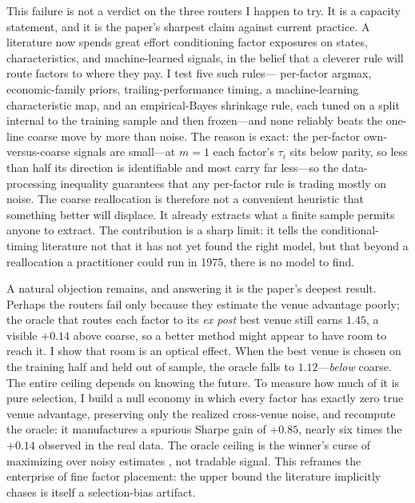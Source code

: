 \documentclass[12pt]{article}
\theoremstyle{plain}
\theoremstyle{definition}
\begin{document}
This failure is not a verdict on the three routers I happen to try. It is a
capacity statement, and it is the paper's sharpest claim against current
practice. A literature now spends great effort conditioning factor exposures on
states, characteristics, and machine-learned signals, in the belief that a
cleverer rule will route factors to where they pay. I test five such rules---
per-factor argmax, economic-family priors, trailing-performance timing, a
machine-learning characteristic map, and an empirical-Bayes shrinkage rule, each
tuned on a split internal to the training sample and then frozen---and none
reliably beats the one-line coarse move by more than noise. The reason is exact:
the per-factor own-versus-coarse signals are small---at $m=1$ each factor's
$\tau_i$ sits below parity, so less than half its direction is identifiable and
most carry far less---so the data-processing inequality guarantees that any
per-factor rule is trading mostly on noise. The
coarse reallocation is therefore not a convenient heuristic that something better
will displace. It already extracts what a finite sample permits anyone to
extract. The contribution is a sharp limit: it tells the conditional-timing
literature not that it has not yet found the right model, but that beyond a
reallocation a practitioner could run in 1975, there is no model to find.

A natural objection remains, and answering it is the paper's deepest result.
Perhaps the routers fail only because they estimate the venue advantage poorly;
the oracle that routes each factor to its \emph{ex post} best venue still earns
$1.45$, a visible $+0.14$ above coarse, so a better method might appear to have
room to reach it. I show that room is an optical effect. When the
best venue is chosen on the training half and held out of sample, the oracle
falls to $1.12$---\emph{below} coarse. The entire ceiling depends on knowing the
future. To measure how much of it is pure selection, I build a null economy in
which every factor has exactly zero true venue advantage, preserving only the
realized cross-venue noise, and recompute the oracle: it manufactures a spurious
Sharpe gain of $+0.85$, nearly six times the $+0.14$ observed in the real data.
The oracle ceiling is the winner's curse of maximizing over noisy estimates
\citep{HarveyLiu2015,BaileyLopezdePrado2014}, not tradable signal. This reframes
the enterprise of fine factor placement: the upper bound the literature
implicitly chases is itself a selection-bias artifact.
\end{document}
